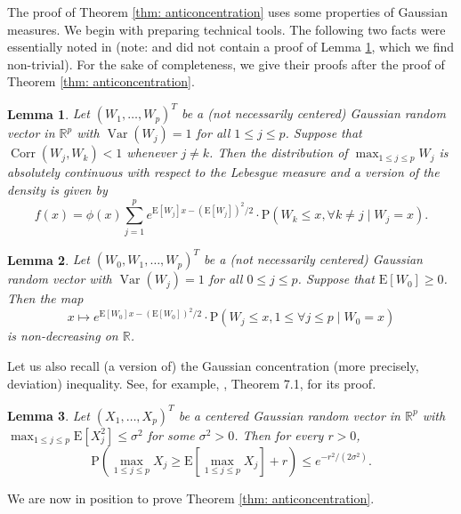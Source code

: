 \documentclass[11pt,reqno]{amsart}
\newtheorem{lemma}{Lemma}
\theoremstyle{definition}
\newcommand{\Ep}{{\mathrm{E}}}
\renewcommand{\Pr}{{\mathrm{P}}}
\newcommand{\RR}{\mathbb{R}}
\DeclareMathOperator{\Corr}{Corr}
\DeclareMathOperator{\Var}{Var}
\begin{document}
The proof of Theorem  \ref{thm: anticoncentration} uses some properties of Gaussian measures.
We begin with preparing technical tools. The following two facts were essentially noted in \cite{Y65,Y68} (note: \cite{Y65} and \cite{Y68} did not contain a proof of Lemma \ref{lemma: Y65-1}, which we find non-trivial). For the sake of completeness, we give their proofs after the proof of Theorem \ref{thm: anticoncentration}.
\begin{lemma}
\label{lemma: Y65-1}
Let $(W_{1},\dots,W_{p})^{T}$ be a (not necessarily centered) Gaussian random vector in $\RR^{p}$ with $\Var(W_{j}) = 1$ for all $1 \leq j \leq p$.  Suppose that $\Corr(W_{j},W_{k})<1$ whenever $j \neq k$. Then the distribution of $\max_{1 \leq j \leq p} W_{j}$ is absolutely continuous with respect to the Lebesgue measure and a version of the density is given by
\begin{equation}
f(x) = \phi(x) \sum_{j=1}^{p} e^{ \Ep[W_{j}] x-(\Ep[W_{j}])^2/2 } \cdot \Pr\left (W_{k} \leq x, \forall k \neq j \mid W_{j} = x \right). \label{density}
\end{equation}
\end{lemma}

\begin{lemma}
\label{lemma: Y65-2}
Let $(W_{0},W_{1},\dots,W_{p})^{T}$ be  a (not necessarily centered) Gaussian random vector with $\Var(W_{j}) =1 $ for all $0 \leq j \leq p$. Suppose that $\Ep[W_{0} ]\geq 0$. Then the map
\begin{equation}\label{eq: prob}
x \mapsto  e^{ \Ep[W_{0} ] x-(\Ep[W_{0}])^2/2 } \cdot\Pr( W_{j} \leq x, 1 \leq \forall j \leq p  \mid W_{0} = x)
\end{equation}
is non-decreasing on $\RR$.
\end{lemma}

Let us also recall (a version of) the Gaussian concentration (more precisely, deviation) inequality. See,  for example,  \cite{L01}, Theorem 7.1, for its proof.
\begin{lemma}\label{thm3}
Let $(X_{1},\dots,X_{p})^{T}$ be a centered Gaussian random vector in $\RR^{p}$ with $\max_{1 \leq j \leq p} \Ep [X_{j}^{2}] \leq  \sigma^{2}$ for some $\sigma^{2}> 0$. Then for every $r > 0$,
\begin{equation*}
\Pr  ( \max_{1 \leq j \leq p} X_{j} \geq \Ep [ \max_{ 1 \leq j \leq p} X_{j}  ] + r ) \leq e^{-r^{2}/(2\sigma^{2})}.
\end{equation*}
\end{lemma}

We are now in position to prove Theorem \ref{thm: anticoncentration}.
\end{document}

